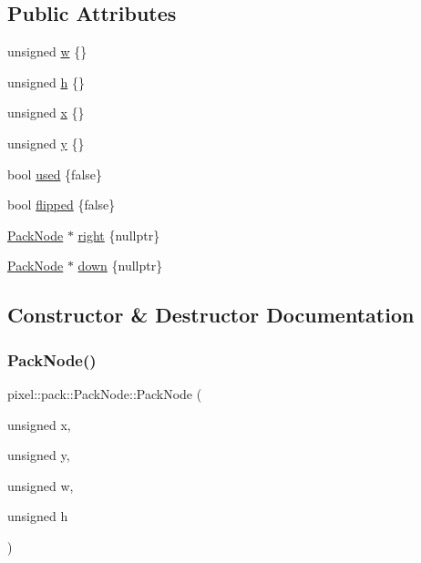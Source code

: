 \subsection*{Public Attributes}
\begin{DoxyCompactItemize}
\item 
unsigned \hyperlink{structpixel_1_1pack_1_1_pack_node_af54e70dd691d64ac8696dc353a53de72}{w} \{\}
\item 
unsigned \hyperlink{structpixel_1_1pack_1_1_pack_node_a380024626a85cde82d459a86e79c7651}{h} \{\}
\item 
unsigned \hyperlink{structpixel_1_1pack_1_1_pack_node_a6354ce26408343f8285102c6457e2ad0}{x} \{\}
\item 
unsigned \hyperlink{structpixel_1_1pack_1_1_pack_node_a5f7655b61750b69345416a77ee2138cb}{y} \{\}
\item 
bool \hyperlink{structpixel_1_1pack_1_1_pack_node_ac15528125c21b185065569689f65a76f}{used} \{false\}
\item 
bool \hyperlink{structpixel_1_1pack_1_1_pack_node_ae718b2584684e9b08e76d8619674d301}{flipped} \{false\}
\item 
\hyperlink{structpixel_1_1pack_1_1_pack_node}{Pack\+Node} $\ast$ \hyperlink{structpixel_1_1pack_1_1_pack_node_a3622911c5c2374af970989dff1cb8485}{right} \{nullptr\}
\item 
\hyperlink{structpixel_1_1pack_1_1_pack_node}{Pack\+Node} $\ast$ \hyperlink{structpixel_1_1pack_1_1_pack_node_a21d64fe74713de90912922f7aff1c768}{down} \{nullptr\}
\end{DoxyCompactItemize}


\subsection{Constructor \& Destructor Documentation}
\mbox{\label{structpixel_1_1pack_1_1_pack_node_aa878a4442b6d942b8f7fc83e75244dcd}} 
\subsubsection{\texorpdfstring{Pack\+Node()}{PackNode()}\hspace{0.1cm}{\footnotesize\ttfamily [1/2]}}
{\footnotesize\ttfamily pixel\+::pack\+::\+Pack\+Node\+::\+Pack\+Node (\begin{DoxyParamCaption}\item[{unsigned}]{x,  }\item[{unsigned}]{y,  }\item[{unsigned}]{w,  }\item[{unsigned}]{h }\end{DoxyParamCaption})\hspace{0.3cm}{\ttfamily [inline]}}


